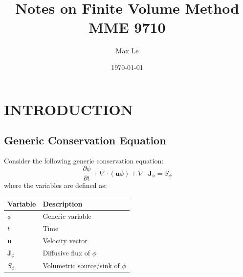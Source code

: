 \documentclass[11pt]{article}
\author{Max Le}
\date{\today}
\title{Notes on Finite Volume Method MME 9710}
\begin{document}
\maketitle
\tableofcontents




\lstset{style=mystyle}

\renewcommand{\arraystretch}{2}
\renewcommand{\footrulewidth}{0.4pt}%
\pagestyle{fancy}
\fancyhf{}
\fancyfoot{}
\fancyhead[L]{\scriptsize{\leftmark}}
\fancyhead[R]{\scriptsize{\rightmark}}



\section{INTRODUCTION}
\label{sec:org055e959}
\subsection{Generic Conservation Equation}
\label{sec:org293155b}
Consider the following generic conservation equation:
\begin{equation}
\frac{\partial \phi}{\partial t} + \nabla \cdot (\textbf{u}\phi) + \nabla \cdot \textbf{J}_\phi = S_\phi
\end{equation}
where the variables are defined as:


\begin{center}
\begin{tabular}{ll}
\textbf{Variable} & \textbf{Description}\\
\hline
\(\phi\) & Generic variable\\
\(t\) & Time\\
\textbf{u} & Velocity vector\\
\(\textbf{J}_\phi\) & Diffusive flux of \(\phi\)\\
\(S_\phi\) & Volumetric source/sink of \(\phi\)\\
\hline
\end{tabular}
\end{center}
\end{document}
